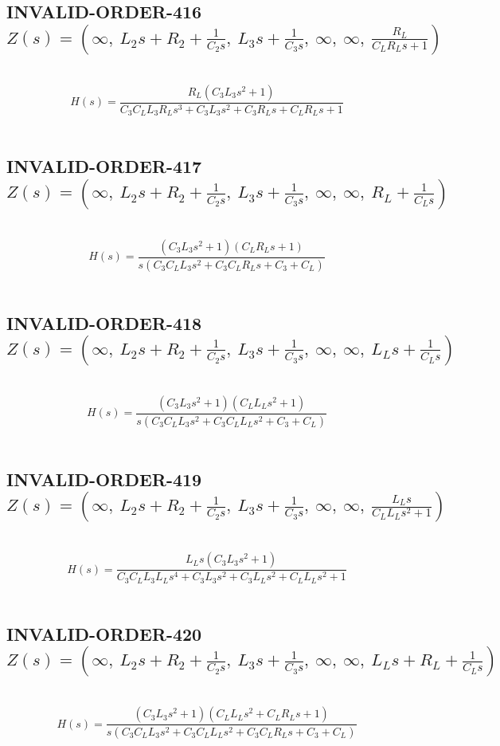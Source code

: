 \documentclass{article}
\begin{document}
\subsection{INVALID-ORDER-416 $Z(s) = \left( \infty, \  L_{2} s + R_{2} + \frac{1}{C_{2} s}, \  L_{3} s + \frac{1}{C_{3} s}, \  \infty, \  \infty, \  \frac{R_{L}}{C_{L} R_{L} s + 1}\right)$ } \ 
\textbf{\[H(s) = \frac{R_{L} \left(C_{3} L_{3} s^{2} + 1\right)}{C_{3} C_{L} L_{3} R_{L} s^{3} + C_{3} L_{3} s^{2} + C_{3} R_{L} s + C_{L} R_{L} s + 1}\] } \ 
\subsection{INVALID-ORDER-417 $Z(s) = \left( \infty, \  L_{2} s + R_{2} + \frac{1}{C_{2} s}, \  L_{3} s + \frac{1}{C_{3} s}, \  \infty, \  \infty, \  R_{L} + \frac{1}{C_{L} s}\right)$ } \ 
\textbf{\[H(s) = \frac{\left(C_{3} L_{3} s^{2} + 1\right) \left(C_{L} R_{L} s + 1\right)}{s \left(C_{3} C_{L} L_{3} s^{2} + C_{3} C_{L} R_{L} s + C_{3} + C_{L}\right)}\] } \ 
\subsection{INVALID-ORDER-418 $Z(s) = \left( \infty, \  L_{2} s + R_{2} + \frac{1}{C_{2} s}, \  L_{3} s + \frac{1}{C_{3} s}, \  \infty, \  \infty, \  L_{L} s + \frac{1}{C_{L} s}\right)$ } \ 
\textbf{\[H(s) = \frac{\left(C_{3} L_{3} s^{2} + 1\right) \left(C_{L} L_{L} s^{2} + 1\right)}{s \left(C_{3} C_{L} L_{3} s^{2} + C_{3} C_{L} L_{L} s^{2} + C_{3} + C_{L}\right)}\] } \ 
\subsection{INVALID-ORDER-419 $Z(s) = \left( \infty, \  L_{2} s + R_{2} + \frac{1}{C_{2} s}, \  L_{3} s + \frac{1}{C_{3} s}, \  \infty, \  \infty, \  \frac{L_{L} s}{C_{L} L_{L} s^{2} + 1}\right)$ } \ 
\textbf{\[H(s) = \frac{L_{L} s \left(C_{3} L_{3} s^{2} + 1\right)}{C_{3} C_{L} L_{3} L_{L} s^{4} + C_{3} L_{3} s^{2} + C_{3} L_{L} s^{2} + C_{L} L_{L} s^{2} + 1}\] } \ 
\subsection{INVALID-ORDER-420 $Z(s) = \left( \infty, \  L_{2} s + R_{2} + \frac{1}{C_{2} s}, \  L_{3} s + \frac{1}{C_{3} s}, \  \infty, \  \infty, \  L_{L} s + R_{L} + \frac{1}{C_{L} s}\right)$ } \ 
\textbf{\[H(s) = \frac{\left(C_{3} L_{3} s^{2} + 1\right) \left(C_{L} L_{L} s^{2} + C_{L} R_{L} s + 1\right)}{s \left(C_{3} C_{L} L_{3} s^{2} + C_{3} C_{L} L_{L} s^{2} + C_{3} C_{L} R_{L} s + C_{3} + C_{L}\right)}\] } \ 
\end{document}
